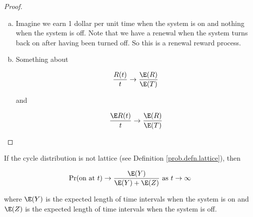 \begin{proof}

\begin{enumerate}[(a)]

\item Imagine we earn 1 dollar per unit time when the system is on and nothing when the system is off. Note that we have a renewal when the system turns back on after having been turned off. So this is a renewal reward process.

\item Something about 

\[
\frac{R(t)}{t} \to \frac{\E(R)}{\E(T)} 
\]

and

\[
\frac{\E R(t)}{t} \to \frac{\E(R)}{\E(T)} 
\]

\end{enumerate}

\end{proof}

\begin{proposition}\label{stoch.on.off.lr.prop} If the cycle distribution is not lattice (see Definition \ref{prob.defn.lattice}), then 

\[
\Pr(\text{on at } t) \to \frac{\E(Y)}{\E(Y) + \E(Z)} \text{ as } t \to \infty
\]

where \(\E(Y)\) is the expected length of time intervals when the system is on and \(\E(Z)\) is the expected length of time intervals when the system is off.

\end{proposition}

